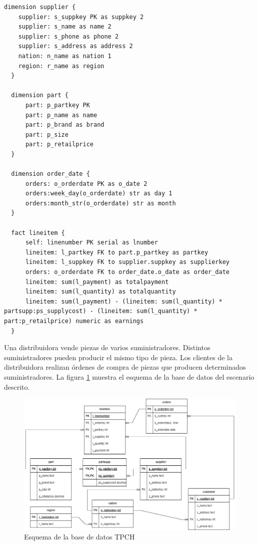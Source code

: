 \begin{lstlisting}[label={tpchstar}, caption={Definici\'on del esquema estrella del almacén de datos asociado al escenario TPCH}]
  dimension supplier {
    supplier: s_suppkey PK as suppkey 2
    supplier: s_name as name 2
    supplier: s_phone as phone 2
    supplier: s_address as address 2
    nation: n_name as nation 1
    region: r_name as region 
  }

  dimension part {
      part: p_partkey PK
      part: p_name as name
      part: p_brand as brand
      part: p_size
      part: p_retailprice
  }

  dimension order_date {
      orders: o_orderdate PK as o_date 2
      orders:week_day(o_orderdate) str as day 1
      orders:month_str(o_orderdate) str as month 
  }

  fact lineitem {
      self: linenumber PK serial as lnumber
      lineitem: l_partkey FK to part.p_partkey as partkey
      lineitem: l_suppkey FK to supplier.suppkey as supplierkey
      orders: o_orderdate FK to order_date.o_date as order_date
      lineitem: sum(l_payment) as totalpayment
      lineitem: sum(l_quantity) as totalquantity
      lineitem: sum(l_payment) - (lineitem: sum(l_quantity) * partsupp:ps_supplycost) - (lineitem: sum(l_quantity) * part:p_retailprice) numeric as earnings
  }
\end{lstlisting}

Una distribuidora vende piezas de varios suministradores. Distintos suministradores pueden 
producir el mismo tipo de pieza. Los clientes de la distribuidora realizan \'ordenes de compra 
de piezas que producen determinados suministradores. La figura \ref{fig:transactionaltpch} muestra el esquema de la base de datos 
del escenario descrito.

\begin{figure}[H]
  \centering
  \includegraphics[scale=0.5]{Graphics/tpch-tpch-transactional.drawio (5).png}
  \caption{Esquema de la base de datos TPCH}
  \label{fig:transactionaltpch}
\end{figure}

